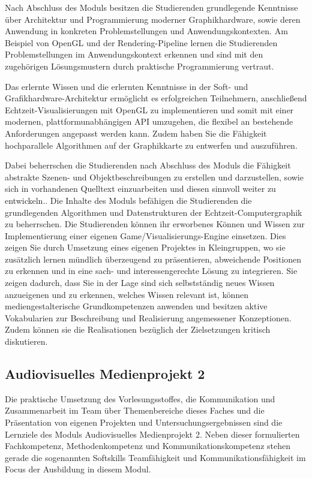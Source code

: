 Nach Abschluss des Moduls besitzen die Studierenden grundlegende
Kenntnisse über Architektur und Programmierung moderner Graphikhardware,
sowie deren Anwendung in konkreten Problemstellungen und
Anwendungskontexten. Am Beispiel von OpenGL und der Rendering-Pipeline
lernen die Studierenden Problemstellungen im Anwendungskontext erkennen
und sind mit den zugehörigen Lösungsmustern durch praktische
Programmierung vertraut.

Das erlernte Wissen und die erlernten Kenntnisse in der Soft- und
Grafikhardware-Architektur ermöglicht es erfolgreichen Teilnehmern,
anschließend Echtzeit-Visualisierungen mit OpenGL zu implementieren und
somit mit einer modernen, plattformunabhängigen API umzugehen, die
flexibel an bestehende Anforderungen angepasst werden kann. Zudem haben
Sie die Fähigkeit hochparallele Algorithmen auf der Graphikkarte zu
entwerfen und auszuführen.

Dabei beherrschen die Studierenden nach Abschluss des Moduls die
Fähigkeit abstrakte Szenen- und Objektbeschreibungen zu erstellen und
darzustellen, sowie sich in vorhandenen Quelltext einzuarbeiten und
diesen sinnvoll weiter zu entwickeln.. Die Inhalte des Moduls befähigen
die Studierenden die grundlegenden Algorithmen und Datenstrukturen der
Echtzeit-Computergraphik zu beherrschen. Die Studierenden können ihr
erworbenes Können und Wissen zur Implementierung einer eigenen
Game/Visualisierungs-Engine einsetzen. Dies zeigen Sie durch Umsetzung
eines eigenen Projektes in Kleingruppen, wo sie zusätzlich lernen
mündlich überzeugend zu präsentieren, abweichende Positionen zu erkennen
und in eine sach- und interessengerechte Lösung zu integrieren. Sie
zeigen dadurch, dass Sie in der Lage sind sich selbstständig neues
Wissen anzueigenen und zu erkennen, welches Wissen relevant ist, können
mediengestalterische Grundkompetenzen anwenden und besitzen aktive
Vokabularien zur Beschreibung und Realisierung angemessener
Konzeptionen. Zudem können sie die Realisationen bezüglich der
Zielsetzungen kritisch diskutieren.

\subsection{Audiovisuelles Medienprojekt
2}\label{audiovisuelles-medienprojekt-2}

Die praktische Umsetzung des Vorlesungsstoffes, die Kommunikation und
Zusammenarbeit im Team über Themenbereiche dieses Faches und die
Präsentation von eigenen Projekten und Untersuchungsergebnissen sind die
Lernziele des Moduls Audiovisuelles Medienprojekt 2. Neben dieser
formulierten Fachkompetenz, Methodenkompetenz und
Kommunikationskompetenz stehen gerade die sogenannten Softskills
Teamfähigkeit und Kommunikationsfähigkeit im Focus der Ausbildung in
diesem Modul.

